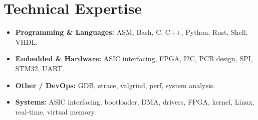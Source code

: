 \documentclass[9pt,a4paper]{article}
\begin{document}
\section*{Technical Expertise}
\begin{tcolorbox}[mybox]
\begin{itemize}
\item \textbf{Programming \& Languages:} ASM, Bash, C, C++, Python, Rust, Shell, VHDL.

\item \textbf{Embedded \& Hardware:} ASIC interfacing, FPGA, I2C, PCB design, SPI, STM32, UART.

\item \textbf{Other / DevOps:} GDB, strace, valgrind, perf, system analysis.

\item \textbf{Systems:} ASIC interfacing, bootloader, DMA, drivers, FPGA, kernel, Linux, real-time, virtual memory.
\end{itemize}
\end{tcolorbox}
\end{document}

